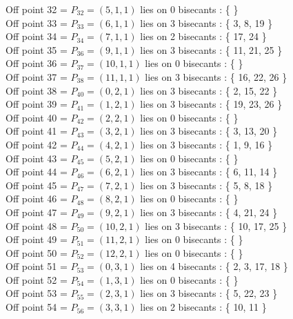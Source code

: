\documentclass{article}
\begin{document}
{Off point 32 = $P_{32} = ( 5, 1, 1 )$ lies on 0 bisecants : \{  \}\\
Off point 33 = $P_{33} = ( 6, 1, 1 )$ lies on 3 bisecants : \{ 3, 8, 19 \}\\
Off point 34 = $P_{34} = ( 7, 1, 1 )$ lies on 2 bisecants : \{ 17, 24 \}\\
Off point 35 = $P_{36} = ( 9, 1, 1 )$ lies on 3 bisecants : \{ 11, 21, 25 \}\\
Off point 36 = $P_{37} = ( 10, 1, 1 )$ lies on 0 bisecants : \{  \}\\
Off point 37 = $P_{38} = ( 11, 1, 1 )$ lies on 3 bisecants : \{ 16, 22, 26 \}\\
Off point 38 = $P_{40} = ( 0, 2, 1 )$ lies on 3 bisecants : \{ 2, 15, 22 \}\\
Off point 39 = $P_{41} = ( 1, 2, 1 )$ lies on 3 bisecants : \{ 19, 23, 26 \}\\
Off point 40 = $P_{42} = ( 2, 2, 1 )$ lies on 0 bisecants : \{  \}\\
Off point 41 = $P_{43} = ( 3, 2, 1 )$ lies on 3 bisecants : \{ 3, 13, 20 \}\\
Off point 42 = $P_{44} = ( 4, 2, 1 )$ lies on 3 bisecants : \{ 1, 9, 16 \}\\
Off point 43 = $P_{45} = ( 5, 2, 1 )$ lies on 0 bisecants : \{  \}\\
Off point 44 = $P_{46} = ( 6, 2, 1 )$ lies on 3 bisecants : \{ 6, 11, 14 \}\\
Off point 45 = $P_{47} = ( 7, 2, 1 )$ lies on 3 bisecants : \{ 5, 8, 18 \}\\
Off point 46 = $P_{48} = ( 8, 2, 1 )$ lies on 0 bisecants : \{  \}\\
Off point 47 = $P_{49} = ( 9, 2, 1 )$ lies on 3 bisecants : \{ 4, 21, 24 \}\\
Off point 48 = $P_{50} = ( 10, 2, 1 )$ lies on 3 bisecants : \{ 10, 17, 25 \}\\
Off point 49 = $P_{51} = ( 11, 2, 1 )$ lies on 0 bisecants : \{  \}\\
Off point 50 = $P_{52} = ( 12, 2, 1 )$ lies on 0 bisecants : \{  \}\\
Off point 51 = $P_{53} = ( 0, 3, 1 )$ lies on 4 bisecants : \{ 2, 3, 17, 18 \}\\
Off point 52 = $P_{54} = ( 1, 3, 1 )$ lies on 0 bisecants : \{  \}\\
Off point 53 = $P_{55} = ( 2, 3, 1 )$ lies on 3 bisecants : \{ 5, 22, 23 \}\\
Off point 54 = $P_{56} = ( 3, 3, 1 )$ lies on 2 bisecants : \{ 10, 11 \}\\
}
\end{document}
